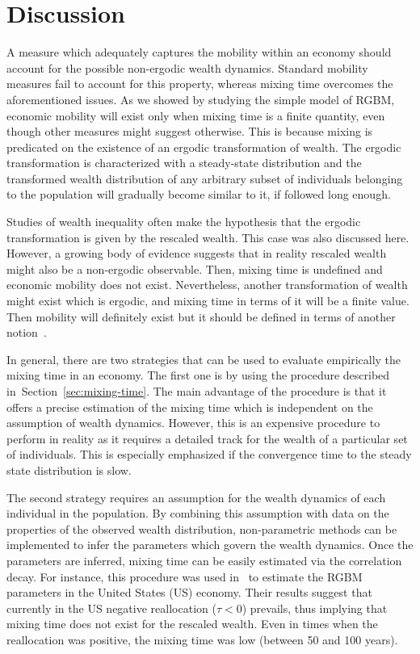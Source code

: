 \documentclass[11pt]{article}
\newcommand{\Sref}[1]{Section~\ref{sec:#1}}
\numberwithin{equation}{section}
\begin{document}
\section{Discussion}
\label{sec:discussion}
A measure which adequately captures the mobility within an economy should account for the possible non-ergodic wealth dynamics. Standard mobility measures fail to account for this property, whereas mixing time overcomes the aforementioned issues. As we showed by studying the simple model of RGBM, economic mobility will exist only when mixing time is a finite quantity, even though other measures might suggest otherwise. This is because mixing is predicated on the existence of an ergodic transformation of wealth. The ergodic transformation is characterized with a steady-state distribution and the transformed wealth distribution of any arbitrary subset of individuals belonging to the population will gradually become similar to it, if followed long enough. 

Studies of wealth inequality often make the hypothesis that the ergodic transformation is given by the rescaled wealth. This case was also discussed here. However, a growing body of evidence suggests that in reality rescaled wealth might also be a non-ergodic observable. Then, mixing time is undefined and economic mobility does not exist. Nevertheless, another transformation of wealth might exist which is ergodic, and mixing time in terms of it will be a finite value. Then mobility will definitely exist but it should be defined in terms of another notion~\cite{jantti2015income}.

In general, there are two strategies that can be used to evaluate empirically the mixing time in an economy. The first one is by using the procedure described in~\Sref{mixing-time}. The main advantage of the procedure is that it offers a precise estimation of the mixing time which is independent on the assumption of wealth dynamics. However, this is an expensive procedure to perform in reality as it requires a detailed track for the wealth of a particular set of individuals. This is especially emphasized if the convergence time to the steady state distribution is slow.

The second strategy requires an assumption for the wealth dynamics of each individual in the population. By combining this assumption with data on the properties of the observed wealth distribution, non-parametric methods can be implemented to infer the parameters which govern the wealth dynamics. Once the parameters are inferred, mixing time can be easily estimated via the correlation decay. For instance, this procedure was used in~\cite{BermanPetersAdamou2019} to estimate the RGBM parameters in the United States (US) economy. Their results suggest that currently in the US  negative reallocation ($\tau < 0$) prevails, thus implying that mixing time does not exist for the rescaled wealth. Even in times when the reallocation was positive, the mixing time was low (between 50 and 100 years).  
\end{document}
